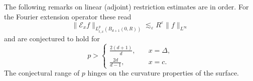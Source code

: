 \documentclass{amsart}
\theoremstyle{definition}
\begin{document}
The following remarks on linear (adjoint) restriction estimates are in order. 
For the Fourier extension operator these read
\begin{equation}
\label{eq:LinearFourierRestrictionIntro}
\| \mathcal{E}_{x} f \|_{L^p_{t,x}(B_{d+1}(0,R))} \lesssim_\varepsilon R^{\varepsilon} \| f \|_{L^\infty}
\end{equation}
and are conjectured to hold for 
\begin{equation*}
p >
\begin{cases}
\frac{2(d+1)}{d}, \quad &x = \Delta, \\
\frac{2d}{d-1}, \quad &x = c.
\end{cases}
\end{equation*}
The conjectural range of $p$ hinges on the curvature properties of the surface.
\end{document}
